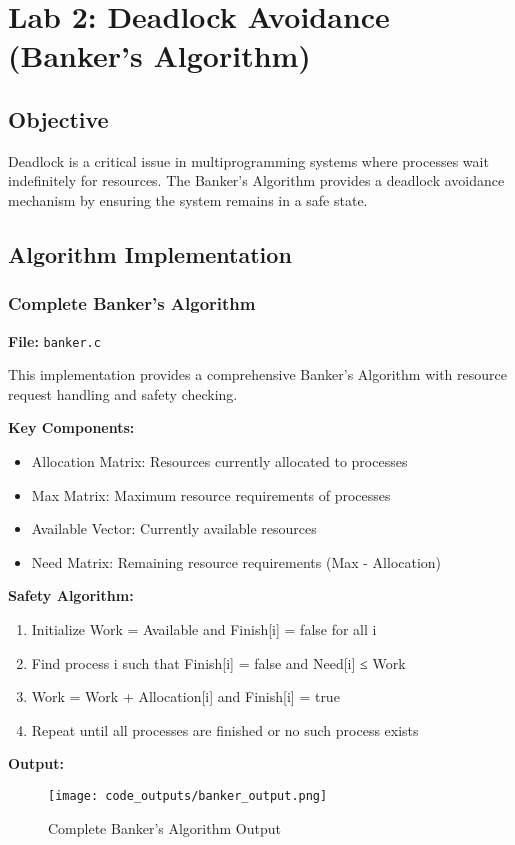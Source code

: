 \documentclass[12pt,a4paper]{article}
\begin{document}
\section{Lab 2: Deadlock Avoidance (Banker's Algorithm)}

\subsection{Objective}
Deadlock is a critical issue in multiprogramming systems where processes wait indefinitely for resources. The Banker's Algorithm provides a deadlock avoidance mechanism by ensuring the system remains in a safe state.

\subsection{Algorithm Implementation}

\subsubsection{Complete Banker's Algorithm}
\textbf{File:} \texttt{banker.c}

This implementation provides a comprehensive Banker's Algorithm with resource request handling and safety checking.

\textbf{Key Components:}
\begin{itemize}
    \item Allocation Matrix: Resources currently allocated to processes
    \item Max Matrix: Maximum resource requirements of processes
    \item Available Vector: Currently available resources
    \item Need Matrix: Remaining resource requirements (Max - Allocation)
\end{itemize}

\textbf{Safety Algorithm:}
\begin{enumerate}
    \item Initialize Work = Available and Finish[i] = false for all i
    \item Find process i such that Finish[i] = false and Need[i] ≤ Work
    \item Work = Work + Allocation[i] and Finish[i] = true
    \item Repeat until all processes are finished or no such process exists
\end{enumerate}

\textbf{Output:}
\begin{figure}[H]
    \centering
    \texttt{[image: code\_outputs/banker\_output.png]}
    \caption{Complete Banker's Algorithm Output}
    \label{fig:banker_output}
\end{figure}
\end{document}
